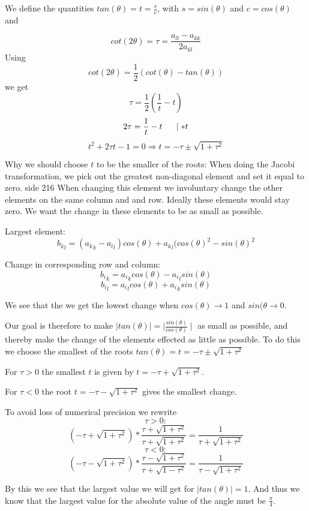 \documentclass[a4paper,12pt, english]{article}
\begin{document}
We define the quantities $tan(\theta) = t = \frac{s}{c}$, with $s=sin(\theta)$ and $c = cos(\theta)$ and 

$$cot(2\theta) = \tau = \frac{a_{ll}- a_{kk}}{2a_{kl}} $$ 
Using $$cot(2\theta) = \frac{1}{2}(cot(\theta) - tan(\theta))$$ we get 
$$\tau = \frac{1}{2}(\frac{1}{t} -t) $$
$$2\tau = \frac{1}{t} - t \hspace{5mm} \mid *t $$
$$t^2 + 2\tau t - 1 = 0 \Rightarrow t = -\tau \pm \sqrt{1+\tau^2} $$


Why we should choose $t$ to be the smaller of the roots:
When doing the Jacobi transformation, we pick out the greatest non-diagonal element and set it equal to zero.
side 216
When changing this element we involuntary change the other elements on the same column and and row. Ideally these elements would stay zero. We want the change in these elements to be as small as possible. 

Largest element:
$$ {b_k}_l = ({a_k}_k - {a_l}_l) cos(\theta) + {a_k}_l(cos(\theta)^2 - sin(\theta)^2$$

Change in corresponding row and column:
$$ {b_i}_k = {a_i}_kcos(\theta) - {a_i}_lsin(\theta) $$
$$ {b_i}_l = {a_i}_lcos(\theta) + {a_i}_ksin(\theta) $$
  
We see that the we get the lowest change when $cos(\theta) \rightarrow 1$ and $sin(\theta \rightarrow 0$.

Our goal is therefore to make $ \mid tan(\theta) \mid  = \mid \frac{sin(\theta)}{cos(\theta)} \mid$ as small as possible, and thereby make the change of the elements effected as little as possible.
To do this we choose the smallest of the roots $tan(\theta) = t = - \tau \pm \sqrt{1+\tau^2}$

For $\tau > 0$ the smallest $t$ is given by $ t = - \tau + \sqrt{1+ \tau^2}$.

For $\tau < 0$ the root $ t = - \tau - \sqrt{1+ \tau^2}$ gives the smallest change.  
  
To avoid loss of numerical precision we rewrite
$$\tau>0:$$
$$(-\tau + \sqrt{1 + \tau^2}) * \frac{\tau + \sqrt{1+\tau^2}}{\tau + \sqrt{1+\tau^2}} = \frac{1}{\tau + \sqrt{1+\tau^2}} $$
$$\tau<0:$$
$$(-\tau - \sqrt{1 + \tau^2}) * \frac{\tau - \sqrt{1+\tau^2}}{\tau + \sqrt{1-\tau^2}} = \frac{1}{\tau - \sqrt{1+\tau^2}}$$

By this we see that the largest value we will get for $\mid tan(\theta) \mid = 1$. And thus we know that the largest value for the absolute value of the angle must be $\frac{\pi}{4}$. 
  
\end{document}
